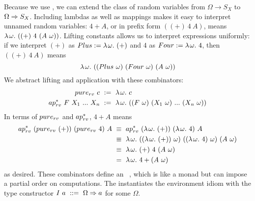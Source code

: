 Because we use \targetlang, we can extend the class of random variables from $\Omega \to S_X$ to $\Omega \Rightarrow S_X$. Including lambdas as well as mappings makes it easy to interpret unnamed random variables: $4 + A$, or in prefix form $((+)~4~A)$, means $\lambda\mspace{2mu}{\omega}\ldotp\, {((+)~4~(A~\omega))}$. Lifting constants allows us to interpret expressions uniformly: if we interpret $(+)$ as $Plus := \lambda\mspace{2mu}{\omega}\ldotp\, (+)$ and $4$ as $Four := \lambda\mspace{2mu}{\omega}\ldotp\, 4$, then $((+)~4~A)$ means
\begin{equation}
	\lambda\mspace{2mu}{\omega}\ldotp\, ((Plus~\omega)~(Four~\omega)~(A~\omega))
\end{equation}
We abstract lifting and application with these combinators:
\begin{equation}
\begin{split}
	\purerv~c &\ :=\  \fun \omega c \\
	\applyrv~F~X_1~\dots~X_\mathit{n} &\ :=\ 
		\fun \omega ((F~\omega)~(X_1~\omega)~\dots~(X_\mathit{n}~\omega))
\end{split}
\end{equation}
In terms of $pure_{rv}$ and $ap^*_{rv}$, $4 + A$ means
\begin{equation}
\begin{aligned}
	ap^*_{rv}~(pure_{rv}~(+))~(pure_{rv}~4)~A
		&\ \equiv\ ap^*_{rv}~(\lambda\mspace{2mu}{\omega}\ldotp\,(+))~(\lambda\mspace{2mu}{\omega}\ldotp\, 4)~A
\\
		&\ \equiv\ \lambda\mspace{2mu}{\omega}\ldotp\, ((\lambda\mspace{2mu}{\omega}\ldotp\,(+))~\omega)~((\lambda\mspace{2mu}{\omega}\ldotp\, 4)~\omega)~(A~\omega)
\\
		&\ \equiv\ \lambda\mspace{2mu}{\omega}\ldotp\, (+)~4~(A~\omega)
\\
		&\ =\ \lambda\mspace{2mu}{\omega}\ldotp\, 4 + (A~\omega)
\end{aligned}
\end{equation}
as desired. These combinators define an ~\cite{cit:mcbride-2008jfp-idiom}, which is like a monad but can impose a partial order on computations. The  instantiates the environment idiom with the type constructor $I~a\ ::=\ \Omega \Rightarrow a$ for some $\Omega$.

